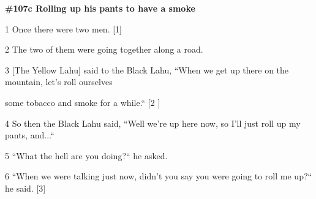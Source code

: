 
{\Large{}\textbf{\#107c Rolling up his pants to have a smoke}}

{\Large{}1 Once there were two men. [1] }

{\Large{}2 The two of them were going together along a road. }

{\Large{}3 [The Yellow Lahu] said to the Black Lahu, ``When we get up there
on the mountain, let's roll ourselves    }

{\Large{}some tobacco and smoke for a while.`` [2 ] }

{\Large{}4 So then the Black Lahu said, ``Well we're up here now, so I'll
just roll up my pants, and...``}

{\Large{}5 ``What the hell are you doing?`` he asked.}

{\Large{}6 ``When we were talking just now, didn't you say you were going
to roll me up?`` he said. [3]}

